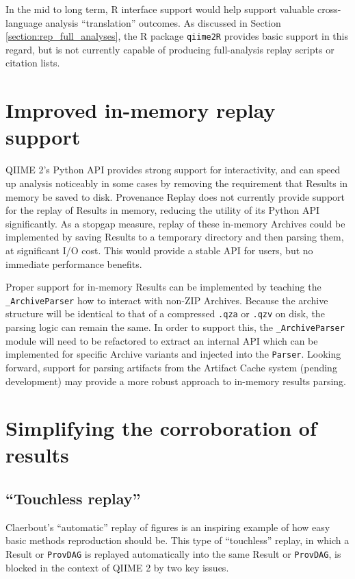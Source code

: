 In the mid to long term, R interface support would help support valuable
cross-language analysis “translation” outcomes. As discussed in Section \ref{section:rep_full_analyses},
the R package \texttt{qiime2R} \parencite{bisanz_tutorial_2018} provides basic
support in this regard, but is not currently capable of producing full-analysis
replay scripts or citation lists.

\section{Improved in-memory replay support \parencite[Issue 22]{keefe_issues_2021}}
QIIME 2’s Python API provides strong support for interactivity, and can speed up
analysis noticeably in some cases by removing the requirement that Results in
memory be saved to disk. Provenance Replay does not currently provide support
for the replay of Results in memory, reducing the utility of its Python API
significantly. As a stopgap measure, replay of these in-memory Archives could be
implemented by saving Results to a temporary directory and then parsing them, at
significant I/O cost. This would provide a stable API for users, but no immediate
performance benefits.

Proper support for in-memory Results can be implemented by teaching the
\texttt{\_ArchiveParser} how to interact with non-ZIP Archives. Because the
archive structure will be identical to that of a compressed \texttt{.qza} or \texttt{.qzv} on
disk, the parsing logic can remain the same. In order to support this, the
\texttt{\_ArchiveParser} module will need to be refactored to extract an internal API
which can be implemented for specific Archive variants and injected into the
\texttt{Parser}. Looking forward, support for parsing artifacts from the Artifact Cache
system (pending development) may provide a more robust approach to in-memory
results parsing.

\section{Simplifying the corroboration of results}

\subsection{“Touchless replay” \parencite[Issue 63]{keefe_issues_2021}}
\label{section:touchless_replay}

Claerbout’s “automatic” replay of figures is an inspiring example of how easy
basic methods reproduction should be. This type of “touchless” replay, in which
a Result or \texttt{ProvDAG} is replayed automatically into the same Result or \texttt{ProvDAG},
is blocked in the context of QIIME 2 by two key issues.

